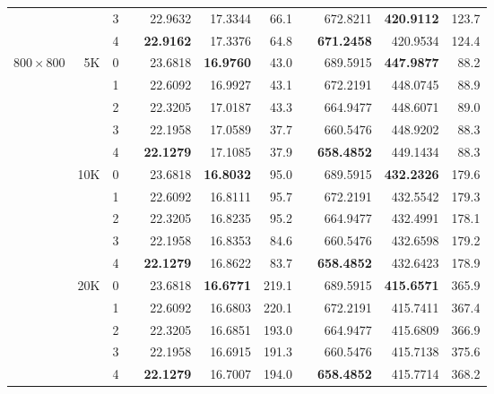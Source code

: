 \begin{table}[p!]
{\begin{tabular*}{\hsize}{crrlrrrlrrr}
                &     & 3 &  &      22.9632  &      17.3344  &  66.1 &  &      672.8211  & {\bf 420.9112} & 123.7 \\
                &     & 4 &  & {\bf 22.9162} &      17.3376  &  64.8 &  & {\bf 671.2458} &      420.9534  & 124.4 \\
\hline
$800\times 800$ &  5K & 0 &  &      23.6818  & {\bf 16.9760} &  43.0 &  &      689.5915  & {\bf 447.9877} &  88.2 \\
                &     & 1 &  &      22.6092  &      16.9927  &  43.1 &  &      672.2191  &      448.0745  &  88.9 \\
                &     & 2 &  &      22.3205  &      17.0187  &  43.3 &  &      664.9477  &      448.6071  &  89.0 \\
                &     & 3 &  &      22.1958  &      17.0589  &  37.7 &  &      660.5476  &      448.9202  &  88.3 \\
                &     & 4 &  & {\bf 22.1279} &      17.1085  &  37.9 &  & {\bf 658.4852} &      449.1434  &  88.3 \\
\cline{2-11}
                & 10K & 0 &  &      23.6818  & {\bf 16.8032} &  95.0 &  &      689.5915  & {\bf 432.2326} & 179.6 \\
                &     & 1 &  &      22.6092  &      16.8111  &  95.7 &  &      672.2191  &      432.5542  & 179.3 \\
                &     & 2 &  &      22.3205  &      16.8235  &  95.2 &  &      664.9477  &      432.4991  & 178.1 \\
                &     & 3 &  &      22.1958  &      16.8353  &  84.6 &  &      660.5476  &      432.6598  & 179.2 \\
                &     & 4 &  & {\bf 22.1279} &      16.8622  &  83.7 &  & {\bf 658.4852} &      432.6423  & 178.9 \\
\cline{2-11}
                & 20K & 0 &  &      23.6818  & {\bf 16.6771} & 219.1 &  &      689.5915  & {\bf 415.6571} & 365.9 \\
                &     & 1 &  &      22.6092  &      16.6803  & 220.1 &  &      672.2191  &      415.7411  & 367.4 \\
                &     & 2 &  &      22.3205  &      16.6851  & 193.0 &  &      664.9477  &      415.6809  & 366.9 \\
                &     & 3 &  &      22.1958  &      16.6915  & 191.3 &  &      660.5476  &      415.7138  & 375.6 \\
                &     & 4 &  & {\bf 22.1279} &      16.7007  & 194.0 &  & {\bf 658.4852} &      415.7714  & 368.2 \\
\hline
\end{tabular*}}
\end{table}

